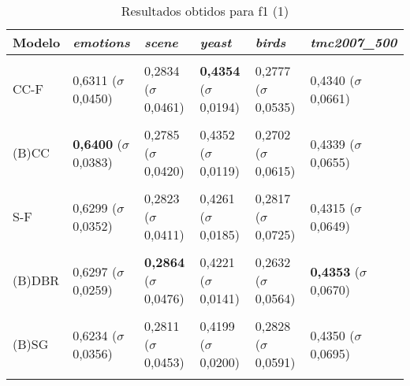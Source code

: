 
\begin{table}[htbp]
	\centering
	\caption{Resultados obtidos para f1 (1)}
		\begin{tabular}
        { p{0.88in} p{0.88in} p{0.88in} p{0.88in} p{0.88in} p{0.88in} }
        
        \hline
Modelo & \textit{emotions} & \textit{scene} & \textit{yeast} & \textit{birds} & \textit{tmc2007\_500} \\ 
\hline \\

CC-F & 0,6311 \newline ($\sigma$ 0,0450) & 0,2834 \newline ($\sigma$ 0,0461) & \textbf{0,4354} \newline ($\sigma$ 0,0194) & 0,2777 \newline ($\sigma$ 0,0535) & 0,4340 \newline ($\sigma$ 0,0661) \\ \\
(B)CC & \textbf{0,6400} \newline ($\sigma$ 0,0383) & 0,2785 \newline ($\sigma$ 0,0420) & 0,4352 \newline ($\sigma$ 0,0119) & 0,2702 \newline ($\sigma$ 0,0615) & 0,4339 \newline ($\sigma$ 0,0655) \\ \\
S-F & 0,6299 \newline ($\sigma$ 0,0352) & 0,2823 \newline ($\sigma$ 0,0411) & 0,4261 \newline ($\sigma$ 0,0185) & 0,2817 \newline ($\sigma$ 0,0725) & 0,4315 \newline ($\sigma$ 0,0649) \\ \\
(B)DBR & 0,6297 \newline ($\sigma$ 0,0259) & \textbf{0,2864} \newline ($\sigma$ 0,0476) & 0,4221 \newline ($\sigma$ 0,0141) & 0,2632 \newline ($\sigma$ 0,0564) & \textbf{0,4353} \newline ($\sigma$ 0,0670) \\ \\
(B)SG & 0,6234 \newline ($\sigma$ 0,0356) & 0,2811 \newline ($\sigma$ 0,0453) & 0,4199 \newline ($\sigma$ 0,0200) & 0,2828 \newline ($\sigma$ 0,0591) & 0,4350 \newline ($\sigma$ 0,0695) \\ \\

\end{tabular}
\end{table}
